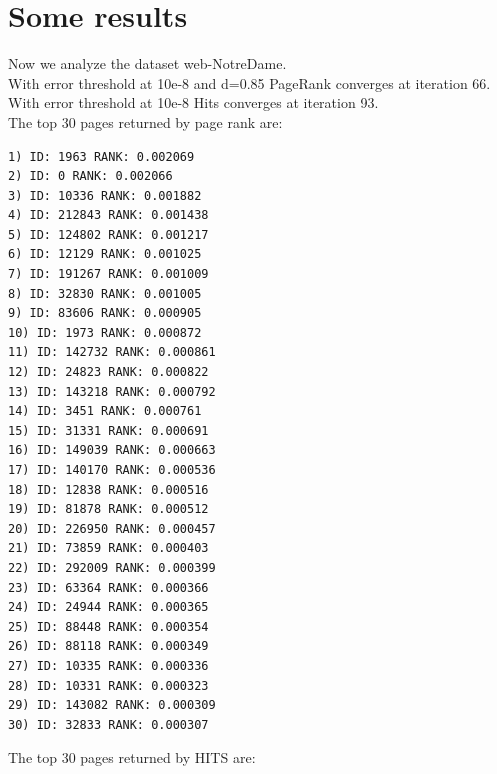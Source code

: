 \documentclass[10pt]{article}
\begin{document}
\section{Some results}
Now we analyze the dataset web-NotreDame. \\
With error threshold at 10e-8 and d=0.85 PageRank converges at iteration 66.\\
With error threshold at 10e-8 Hits converges at iteration 93.\\
The top 30 pages returned by page rank are:
\begin{verbatim}
1) ID: 1963 RANK: 0.002069
2) ID: 0 RANK: 0.002066
3) ID: 10336 RANK: 0.001882
4) ID: 212843 RANK: 0.001438
5) ID: 124802 RANK: 0.001217
6) ID: 12129 RANK: 0.001025
7) ID: 191267 RANK: 0.001009
8) ID: 32830 RANK: 0.001005
9) ID: 83606 RANK: 0.000905
10) ID: 1973 RANK: 0.000872
11) ID: 142732 RANK: 0.000861
12) ID: 24823 RANK: 0.000822
13) ID: 143218 RANK: 0.000792
14) ID: 3451 RANK: 0.000761
15) ID: 31331 RANK: 0.000691
16) ID: 149039 RANK: 0.000663
17) ID: 140170 RANK: 0.000536
18) ID: 12838 RANK: 0.000516
19) ID: 81878 RANK: 0.000512
20) ID: 226950 RANK: 0.000457
21) ID: 73859 RANK: 0.000403
22) ID: 292009 RANK: 0.000399
23) ID: 63364 RANK: 0.000366
24) ID: 24944 RANK: 0.000365
25) ID: 88448 RANK: 0.000354
26) ID: 88118 RANK: 0.000349
27) ID: 10335 RANK: 0.000336
28) ID: 10331 RANK: 0.000323
29) ID: 143082 RANK: 0.000309
30) ID: 32833 RANK: 0.000307
\end{verbatim}
The top 30 pages returned by HITS are:
\end{document}
